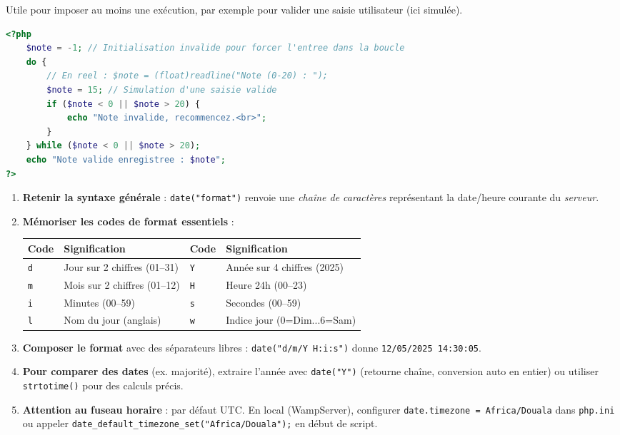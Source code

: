 \documentclass[11pt]{article}
\newcounter{popsec}
\newcounter{popsub}
\newcommand{\courssub}[1]{%
  \stepcounter{popsub}%
  \par\vspace{9pt}\noindent{\popxbold\fontsize{11.5}{13}\selectfont\color{popink}{\color{poporange}\thepopsec.\thepopsub}\hspace{6pt}#1}\par\nopagebreak\vspace{4pt}
}
\begin{document}
\begin{exemplebox}
Utile pour imposer au moins une exécution, par exemple pour valider une saisie utilisateur (ici simulée).
\begin{lstlisting}[language=Php]
<?php
    $note = -1; // Initialisation invalide pour forcer l'entree dans la boucle
    do {
        // En reel : $note = (float)readline("Note (0-20) : ");
        $note = 15; // Simulation d'une saisie valide
        if ($note < 0 || $note > 20) {
            echo "Note invalide, recommencez.<br>";
        }
    } while ($note < 0 || $note > 20);
    echo "Note valide enregistree : $note";
?>
\end{lstlisting}
\end{exemplebox}

\courssub{La fonction date()}

\begin{methode}
\begin{enumerate}
\item \textbf{Retenir la syntaxe générale} : \texttt{date("format")} renvoie une \emph{chaîne de caractères} représentant la date/heure courante du \emph{serveur}.
\item \textbf{Mémoriser les codes de format essentiels} :
  \begin{center}
  \begin{tabularx}{\linewidth}{|l|X|l|X|}\hline
  \textbf{Code} & \textbf{Signification} & \textbf{Code} & \textbf{Signification} \\\hline
  \texttt{d} & Jour sur 2 chiffres (01--31) & \texttt{Y} & Année sur 4 chiffres (2025) \\\hline
  \texttt{m} & Mois sur 2 chiffres (01--12) & \texttt{H} & Heure 24h (00--23) \\\hline
  \texttt{i} & Minutes (00--59) & \texttt{s} & Secondes (00--59) \\\hline
  \texttt{l} & Nom du jour (anglais) & \texttt{w} & Indice jour (0=Dim...6=Sam) \\\hline
  \end{tabularx}
  \end{center}
\item \textbf{Composer le format} avec des séparateurs libres : \texttt{date("d/m/Y H:i:s")} donne \texttt{12/05/2025 14:30:05}.
\item \textbf{Pour comparer des dates} (ex. majorité), extraire l'année avec \texttt{date("Y")} (retourne chaîne, conversion auto en entier) ou utiliser \texttt{strtotime()} pour des calculs précis.
\item \textbf{Attention au fuseau horaire} : par défaut UTC. En local (WampServer), configurer \texttt{date.timezone = Africa/Douala} dans \texttt{php.ini} ou appeler \texttt{date\_default\_timezone\_set("Africa/Douala");} en début de script.
\end{enumerate}
\end{methode}
\end{document}
